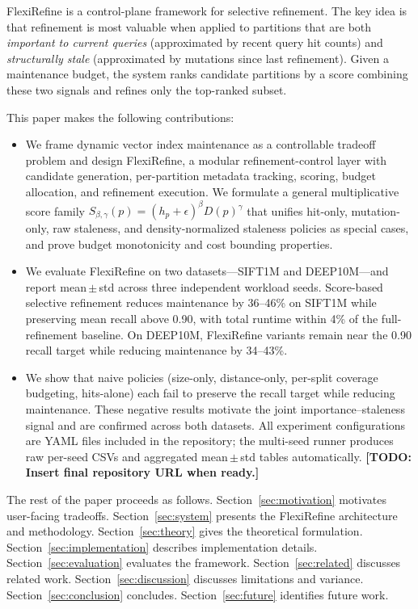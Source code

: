 \documentclass[sigconf, nonacm]{acmart}
\newcommand{\system}{FlexiRefine\xspace}
\newcommand{\todo}[1]{\textbf{[TODO: #1]}}
\begin{document}
\system is a control-plane framework for selective refinement. The key
idea is that refinement is most valuable when applied to partitions that
are both \emph{important to current queries} (approximated by recent
query hit counts) and \emph{structurally stale} (approximated by
mutations since last refinement). Given a maintenance budget, the system
ranks candidate partitions by a score combining these two signals and
refines only the top-ranked subset.

This paper makes the following contributions:

\begin{itemize}[leftmargin=*]
  \item We frame dynamic vector index maintenance as a controllable
    tradeoff problem and design \system, a modular refinement-control
    layer with candidate generation, per-partition metadata tracking,
    scoring, budget allocation, and refinement execution. We formulate
    a general multiplicative score family
    $S_{\beta,\gamma}(p) = (h_p + \epsilon)^\beta D(p)^\gamma$
    that unifies hit-only, mutation-only, raw staleness, and
    density-normalized staleness policies as special cases, and prove
    budget monotonicity and cost bounding properties.

  \item We evaluate \system on two datasets---SIFT1M and DEEP10M---and
    report mean\,$\pm$\,std across three independent workload seeds.
    Score-based selective refinement reduces maintenance by 36--46\%
    on SIFT1M while preserving mean recall above 0.90, with total
    runtime within 4\% of the full-refinement baseline. On DEEP10M,
    FlexiRefine variants remain near the 0.90 recall target while
    reducing maintenance by 34--43\%.

  \item We show that naive policies (size-only, distance-only,
    per-split coverage budgeting, hits-alone) each fail to preserve the
    recall target while reducing maintenance. These negative results
    motivate the joint importance--staleness signal and are confirmed
    across both datasets.
    All experiment configurations are YAML files included in the
    repository; the multi-seed runner produces raw per-seed CSVs and
    aggregated mean\,$\pm$\,std tables automatically.
    \todo{Insert final repository URL when ready.}
\end{itemize}

The rest of the paper proceeds as follows.
Section~\ref{sec:motivation} motivates user-facing tradeoffs.
Section~\ref{sec:system} presents the \system architecture and
methodology.
Section~\ref{sec:theory} gives the theoretical formulation.
Section~\ref{sec:implementation} describes implementation details.
Section~\ref{sec:evaluation} evaluates the framework.
Section~\ref{sec:related} discusses related work.
Section~\ref{sec:discussion} discusses limitations and variance.
Section~\ref{sec:conclusion} concludes.
Section~\ref{sec:future} identifies future work.
\end{document}
